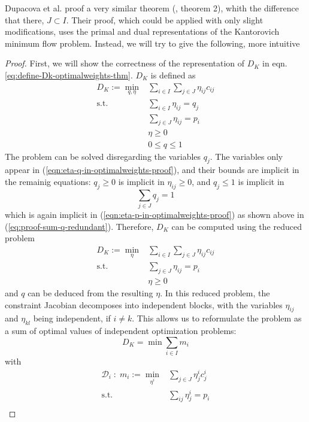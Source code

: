 Dupacova et al. proof a very similar theorem (\cite{Dupacova2003}, theorem 2), whith the difference that there, $J\subset I$. Their proof, which could be applied with only slight modifications, uses the primal and dual representations of the Kantorovich minimum flow problem. Instead, we will try to give the following, more intuitive
\begin{proof}
First, we will show the correctness of the representation of $D_K$ in eqn. \ref{eq:define-Dk-optimalweights-thm}. $D_K$ is defined as
\begin{align}
  D_K := \min\limits_{q, \eta}& \sum_{i\in I}\sum_{j\in J}\eta_{ij}c_{ij}\\
  \text{s.t.}&\sum_{i\in I}\eta_{ij} = q_j\label{eqn:eta-q-in-optimalweights-proof}\\
  &\sum_{j\in J}\eta_{ij} = p_i\label{eqn:eta-p-in-optimalweights-proof}\\
  &\eta \geq 0\\
  &0 \leq q \leq 1
\end{align}
The problem can be solved disregarding the variables $q_j$. The variables only appear in (\ref{eqn:eta-q-in-optimalweights-proof}), and their bounds are implicit in the remainig equations: $q_j\geq 0$ is implicit in $\eta_{ij}\geq 0$, and $q_j\leq 1$ is implicit in 
\[\sum_{j\in J}q_j=1\]
which is again implicit in (\ref{eqn:eta-p-in-optimalweights-proof}) as shown above in  (\ref{eq:proof-sum-q-redundant}). Therefore, $D_K$ can be computed using the reduced problem
\begin{align}
  D_K := \min\limits_{\eta}& \sum_{i\in I}\sum_{j\in J}\eta_{ij}c_{ij}\\
  \text{s.t.}&\sum_{j\in J}\eta_{ij} = p_i\\
  &\eta \geq 0
\end{align}
and $q$ can be deduced from the resulting $\eta$. In this reduced problem, the constraint Jacobian decomposes into independent blocks, with the variables $\eta_{ij}$ and $\eta_{kl}$ being independent, if $i\neq k$. This allows us to reformulate the problem as a sum of optimal values of independent optimization problems:
\begin{equation}
  \label{eqn:Dk-decomposition-in-mi}
  D_K = \min \sum_{i\in I} m_i
\end{equation}
with
\begin{align}
  \mathcal{D}_i\; :\; m_i :=\min\limits_{\eta^i}&\sum_{j\in J}\eta_{j}^ic_{j}^i\\
  \text{s.t.}&\sum_{ij}\eta_j^i = p_i\\

\end{align}
\end{proof}
